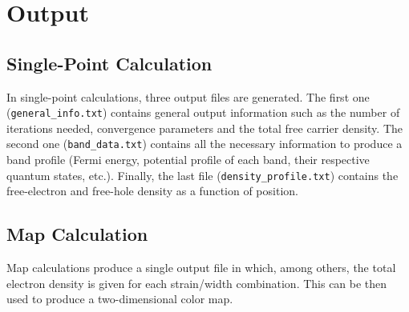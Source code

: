 \documentclass[a4paper,12pt]{article}
\begin{document}
\section{Output}

\subsection{Single-Point Calculation}
In single-point calculations, three output files are generated. The first one (\texttt{general\_info.txt}) contains general output information such as the number of iterations needed, convergence parameters and the total free carrier density. The second one (\texttt{band\_data.txt}) contains all the necessary information to produce a band profile (Fermi energy, potential profile of each band, their respective quantum states, etc.).
Finally, the last file (\texttt{density\_profile.txt}) contains the free-electron and free-hole density as a function of position.


\subsection{Map Calculation}
Map calculations produce a single output file in which, among others, the total electron density is given for each strain/width combination. This can be then used to produce a two-dimensional color map.
\end{document}
